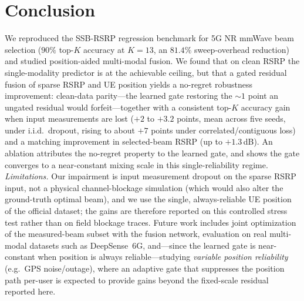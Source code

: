 \documentclass[conference]{IEEEtran}
\begin{document}
\section{Conclusion}\label{sec:conclusion}
We reproduced the SSB-RSRP regression benchmark for 5G NR mmWave beam selection
($90\%$ top-$K$ accuracy at $K=13$, an $81.4\%$ sweep-overhead reduction) and
studied position-aided multi-modal fusion. We found that on clean RSRP the
single-modality predictor is at the achievable ceiling, but that a gated residual
fusion of sparse RSRP and UE position yields a no-regret robustness improvement:
clean-data parity---the learned gate restoring the $\sim$$1$ point an ungated
residual would forfeit---together with a consistent top-$K$ accuracy gain when
input measurements are lost ($+2$ to $+3.2$ points, mean across five seeds, under
i.i.d.\ dropout, rising to about $+7$ points under correlated/contiguous loss) and
a matching improvement in selected-beam RSRP (up to $+1.3$\,dB). An ablation attributes the no-regret
property to the learned gate, and shows the gate converges to a near-constant
mixing scale in this single-reliability regime. \emph{Limitations.} Our
impairment is input measurement dropout on the sparse RSRP input, not a physical
channel-blockage simulation (which would also alter the ground-truth optimal
beam), and we use the single, always-reliable UE position of the official
dataset; the gains are therefore reported on this controlled stress test rather
than on field blockage traces. Future work includes joint optimization of the
measured-beam subset with the fusion network, evaluation on real multi-modal
datasets such as DeepSense~6G, and---since the learned gate is near-constant when
position is always reliable---studying \emph{variable position reliability}
(e.g.\ GPS noise/outage), where an adaptive gate that suppresses the position path
per-user is expected to provide gains beyond the fixed-scale residual reported
here.



\end{document}

